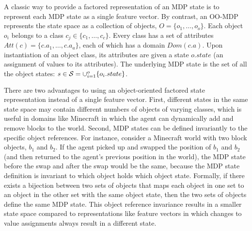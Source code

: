 \documentclass[]{article}
\newcommand{\stnote}[1]{\textcolor{Blue}{\textbf{ST: #1}}}
\newcommand{\dnote}[1]{\textcolor{Orange}{\textbf{D: #1}}}
\begin{document}
A classic way to provide a factored representation of an MDP state is to represent
each MDP state as a single feature vector. By contrast, an OO-MDP represents the state space as a collection of objects,
$O = \{o_1, \ldots, o_o \}$.  Each object $o_i$ belongs to a
class $c_j \in  \{c_1, \ldots, c_c\}$. Every class has a set of attributes
$Att(c) = \{c.a_1, \ldots, c.a_a \}$, each of which has a domain $Dom(c.a)$.
Upon instantiation of an object class, its attributes are given a state $o.state$
(an assignment of values to its attributes).  The underlying MDP state is the set
of all the object states: $s \in {\cal S} = \cup_{i = 1}^o \{o_i.state\}$.

There are two advantages to using an object-oriented factored state
representation instead of a single feature vector. First, different
states in the same state space may contain different numbers of
objects of varying classes, which is useful in domains like Minecraft
in which the agent can dynamically add and remove blocks to the
world. Second, MDP states can be defined invariantly to the specific
object references.  For instance, consider a Minecraft world with two
block objects, $b_1$ and $b_2$.  If the agent picked up and swapped
the position of $b_1$ and $b_2$ (and then returned to the agent's
previous position in the world), the MDP state before the swap and
after the swap would be the same, because the MDP state definition is
invariant to which object holds which object state.  Formally, if
there exists a bijection between two sets of objects that maps each
object in one set to an object in the other set with the same object
state, then the two sets of objects define the same MDP state.  This
object reference invariance results in a smaller state space compared
to representations like feature vectors in which changes to value
assignments always result in a different state.

\end{document}
